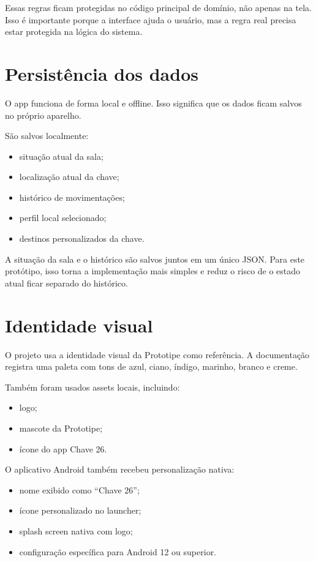 \documentclass[12pt,a4paper]{article}
\begin{document}
Essas regras ficam protegidas no código principal de domínio, não apenas na tela. Isso é importante porque a interface ajuda o usuário, mas a regra real precisa estar protegida na lógica do sistema.

\section{Persistência dos dados}

O app funciona de forma local e offline. Isso significa que os dados ficam salvos no próprio aparelho.

São salvos localmente:

\begin{itemize}
    \item situação atual da sala;
    \item localização atual da chave;
    \item histórico de movimentações;
    \item perfil local selecionado;
    \item destinos personalizados da chave.
\end{itemize}

A situação da sala e o histórico são salvos juntos em um único JSON. Para este protótipo, isso torna a implementação mais simples e reduz o risco de o estado atual ficar separado do histórico.

\section{Identidade visual}

O projeto usa a identidade visual da Prototipe como referência. A documentação registra uma paleta com tons de azul, ciano, índigo, marinho, branco e creme.

Também foram usados assets locais, incluindo:

\begin{itemize}
    \item logo;
    \item mascote da Prototipe;
    \item ícone do app Chave 26.
\end{itemize}

O aplicativo Android também recebeu personalização nativa:

\begin{itemize}
    \item nome exibido como ``Chave 26'';
    \item ícone personalizado no launcher;
    \item splash screen nativa com logo;
    \item configuração específica para Android 12 ou superior.
\end{itemize}
\end{document}
